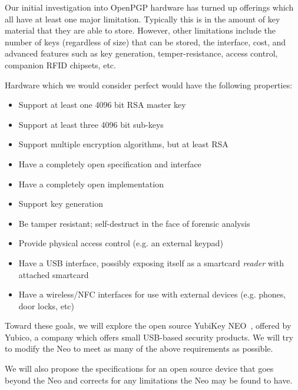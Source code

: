 \documentclass[letterpaper,twocolumn,10pt]{article}
\newcommand{\mlist}[1]{\begin{itemize}#1\end{itemize}}
\begin{document}
Our initial investigation into OpenPGP hardware has turned up
offerings which all have at least one major limitation. Typically this
is in the amount of key material that they are able to store. However,
other limitations include the number of keys (regardless of size) that
can be stored, the interface, cost, and advanced features such as key
generation, temper-resistance, access control, companion RFID
chipsets, etc.

Hardware which we would consider perfect would have the following properties:

\mlist{
\item Support at least one 4096 bit RSA master key
\item Support at least three 4096 bit sub-keys
\item Support multiple encryption algorithms, but at least RSA
\item Have a completely open specification and interface
\item Have a completely open implementation
\item Support key generation
\item Be tamper resistant; self-destruct in the face of
  forensic analysis
\item Provide physical access control (e.g. an external keypad)
\item Have a USB interface, possibly exposing itself as a
  smartcard \textit{reader} with attached smartcard
\item Have a wireless/NFC interfaces for use with external
  devices (e.g. phones, door locks, etc) }

Toward these goals, we will explore the open source YubiKey
NEO~\cite{yubikey}, offered by Yubico, a company which offers small
USB-based security products. We will try to modify the Neo to meet as
many of the above requirements as possible.

We will also propose the specifications for an open source device that
goes beyond the Neo and corrects for any limitations the Neo may be
found to have.

%
%

\footnotesize


\end{document}
